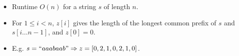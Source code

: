 \begin{itemize}
	\item Runtime $O\left(n\right)$ for a string $s$ of length $n$.
	\item For $1 \leq i < n$, $z\left[i\right]$ gives the length of the longest common prefix of $s$ and $s\left[i\dots n - 1\right]$, and $z\left[0\right] = 0$.
	\item E.g. $s = ``aaabaab" \Rightarrow z =  \left[0,2,1,0,2,1,0\right]$.
\end{itemize}